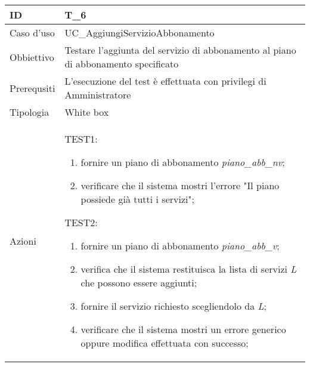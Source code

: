 \begin{table}[hb]
    \centering
    \begin{tabular}{ |p{2cm}|p{10cm}|  }
        \hline
        ID          & T\_6                                                                               \\\hline
        Caso d'uso  & UC\_AggiungiServizioAbbonamento                                                    \\\hline
        Obbiettivo  & Testare l'aggiunta del servizio di abbonamento al piano di abbonamento specificato \\\hline
        Prerequsiti & L'esecuzione del test è effettuata con privilegi di Amministratore                 \\\hline
        Tipologia   & White box                                                                          \\\hline
        Azioni      &
        TEST1:
        \begin{enumerate}[nosep, topsep=0pt]
            \item fornire un piano di abbonamento \emph{piano\_abb\_nv};
            \item verificare che il sistema mostri l'errore "Il piano possiede già tutti i servizi";
        \end{enumerate}
        \vspace{0.5cm} TEST2:
        \begin{enumerate}[nosep, topsep=0pt]
            \item fornire un piano di abbonamento \emph{piano\_abb\_v};
            \item verifica che il sistema restituisca la lista di servizi \emph{L} che possono essere aggiunti;
            \item fornire il servizio richiesto scegliendolo da \emph{L};
            \item verificare che il sistema mostri un errore generico oppure modifica effettuata con successo;
        \end{enumerate}
        \\\hline
    \end{tabular}
\end{table}

